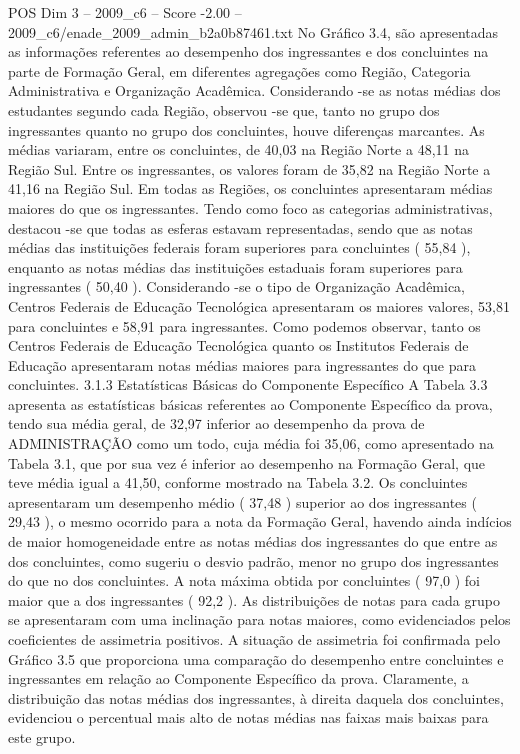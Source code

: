 \begin{textsample}{POS Dim 3 – 2009\_c6 – Score -2.00 – 2009\_c6/enade\_2009\_admin\_b2a0b87461.txt}
No Gráfico 3.4, são apresentadas as informações referentes ao desempenho dos ingressantes e dos concluintes na parte de Formação Geral, em diferentes agregações como Região, Categoria Administrativa e Organização Acadêmica.
Considerando -se as notas médias dos estudantes segundo cada Região, observou -se que, tanto no grupo dos ingressantes quanto no grupo dos concluintes, houve diferenças marcantes.
As médias variaram, entre os concluintes, de 40,03 na Região Norte a 48,11 na Região Sul.
Entre os ingressantes, os valores foram de 35,82 na Região Norte a 41,16 na Região Sul.
Em todas as Regiões, os concluintes apresentaram médias maiores do que os ingressantes.
Tendo como foco as categorias administrativas, destacou -se que todas as esferas estavam representadas, sendo que as notas médias das instituições federais foram superiores para concluintes ( 55,84 ), enquanto as notas médias das instituições estaduais foram superiores para ingressantes ( 50,40 ).
Considerando -se o tipo de Organização Acadêmica, Centros Federais de Educação Tecnológica apresentaram os maiores valores, 53,81 para concluintes e 58,91 para ingressantes.
Como podemos observar, tanto os Centros Federais de Educação Tecnológica quanto os Institutos Federais de Educação apresentaram notas médias maiores para ingressantes do que para concluintes. 3.1.3 Estatísticas Básicas do Componente Específico A Tabela 3.3 apresenta as estatísticas básicas referentes ao Componente Específico da prova, tendo sua média geral, de 32,97 inferior ao desempenho da prova de ADMINISTRAÇÃO como um todo, cuja média foi 35,06, como apresentado na Tabela 3.1, que por sua vez é inferior ao desempenho na Formação Geral, que teve média igual a 41,50, conforme mostrado na Tabela 3.2.
Os concluintes apresentaram um desempenho médio ( 37,48 ) superior ao dos ingressantes ( 29,43 ), o mesmo ocorrido para a nota da Formação Geral, havendo ainda indícios de maior homogeneidade entre as notas médias dos ingressantes do que entre as dos concluintes, como sugeriu o desvio padrão, menor no grupo dos ingressantes do que no dos concluintes.
A nota máxima obtida por concluintes ( 97,0 ) foi maior que a dos ingressantes ( 92,2 ).
As distribuições de notas para cada grupo se apresentaram com uma inclinação para notas maiores, como evidenciados pelos coeficientes de assimetria positivos.
A situação de assimetria foi confirmada pelo Gráfico 3.5 que proporciona uma comparação do desempenho entre concluintes e ingressantes em relação ao Componente Específico da prova.
Claramente, a distribuição das notas médias dos ingressantes, à direita daquela dos concluintes, evidenciou o percentual mais alto de notas médias nas faixas mais baixas para este grupo.

\end{textsample}
